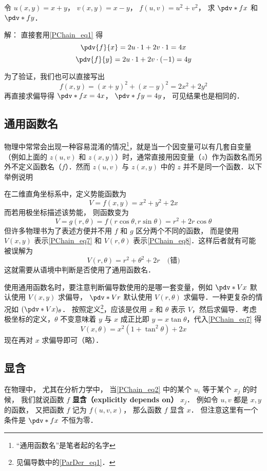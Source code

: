 \begin{example}{}
令 $u(x,y) = x + y$， $v(x,y) = x - y$， $f(u, v) = u^2 + v^2$， 求 $\pdv*{f}{x}$ 和 $\pdv*{f}{y}$．

解： 直接套用\autoref{PChain_eq1} 得
\begin{equation}
\pdv{f}{x} = 2u \cdot 1 + 2v \cdot 1 = 4x
\end{equation}
\begin{equation}
\pdv{f}{y} = 2u \cdot 1 + 2v \cdot (-1) = 4y
\end{equation}

为了验证，我们也可以直接写出
\begin{equation}
f(x, y) = (x+y)^2 + (x-y)^2 = 2x^2 + 2y^2
\end{equation}
再直接求偏导得 $\pdv*{f}{x} = 4x$， $\pdv*{f}{y} = 4y$， 可见结果也是相同的．
\end{example}

\subsection{通用函数名}
物理中常常会出现一种容易混淆的情况\footnote{“通用函数名”是笔者起的名字}，就是当一个因变量可以有几套自变量（例如上面的 $z(u,v)$ 和 $z(x,y)$）时，通常直接用因变量（$z$）作为函数名而另外不定义函数名（$f$）．然而 $z(u,v)$ 与 $z(x,y)$ 中的 $z$ 并不是同一个函数．以下举例说明

\begin{example}{}\label{PChain_ex1}
在二维直角坐标系中，定义势能函数为
\begin{equation}\label{PChain_eq7}
V=f(x,y)=x^2+y^2+2x
\end{equation}
而若用极坐标描述该势能， 则函数变为
\begin{equation}\label{PChain_eq8}
V = g(r,\theta) = f(r\cos \theta , r\sin \theta ) = r^2 + 2r\cos \theta
\end{equation}
但许多物理书为了表述方便并不用 $f$ 和 $g$ 区分两个不同的函数， 而是使用 $V(x,y)$ 表示\autoref{PChain_eq7} 和 $V(r,\theta)$ 表示\autoref{PChain_eq8}．这样后者就有可能被误解为
\begin{equation}
V(r,\theta) = r^2+\theta^2+2r \quad \text{(错)}
\end{equation}
这就需要从语境中判断是否使用了通用函数名．

使用通用函数名时，要注意判断偏导数使用的是哪一套变量，例如 $\pdv*{V}{x}$ 默认使用 $V(x,y)$ 求偏导， $\pdv*{V}{r}$ 默认使用 $V(r,\theta)$ 求偏导．一种更复杂的情况如 $(\pdv*{V}{x})_\theta$． 按照定义\footnote{见偏导数中的\autoref{ParDer_eq1}．}，应该是仅用 $x$ 和 $\theta$ 表示 $V$，然后求偏导．考虑极坐标的定义，$\theta$ 不变意味着 $y$ 与 $x$ 成正比即 $y=x\tan\theta$，代入\autoref{PChain_eq7} 得
\begin{equation}
V(x,\theta)=x^2(1+\tan^2 \theta) + 2x
\end{equation}
现在再对 $x$ 求偏导即可（略）．
\end{example}

\subsection{显含}
在物理中， 尤其在分析力学中， 当\autoref{PChain_eq2} 中的某个 $u_i$ 等于某个 $x_j$ 的时候， 我们就说函数 $f$ \textbf{显含（explicitly depends on）} $x_j$． 例如令 $u, v$ 都是 $x, y$ 的函数， 又把函数 $f$ 记为 $f(u, v, x)$， 那么函数 $f$ 显含 $x$． 但注意这里有一个条件是 $\pdv*{f}{x}$ 不恒为零．

